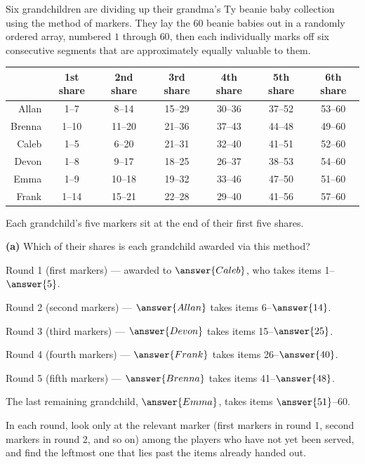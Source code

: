 \documentclass[12pt]{ximera}
\begin{document}
\begin{problem}
Six grandchildren are dividing up their grandma's Ty beanie baby collection using the
method of markers. They lay the $60$ beanie babies out in a randomly ordered array,
numbered $1$ through $60$, then each individually marks off six consecutive segments
that are approximately equally valuable to them.

\begin{center}
\begin{tabular}{r|c|c|c|c|c|c}
& 1st share & 2nd share & 3rd share & 4th share & 5th share & 6th share \\\hline
Allan  & 1--7  & 8--14  & 15--29 & 30--36 & 37--52 & 53--60 \\
Brenna & 1--10 & 11--20 & 21--36 & 37--43 & 44--48 & 49--60 \\
Caleb  & 1--5  & 6--20  & 21--31 & 32--40 & 41--51 & 52--60 \\
Devon  & 1--8  & 9--17  & 18--25 & 26--37 & 38--53 & 54--60 \\
Emma   & 1--9  & 10--18 & 19--32 & 33--46 & 47--50 & 51--60 \\
Frank  & 1--14 & 15--21 & 22--28 & 29--40 & 41--56 & 57--60
\end{tabular}
\end{center}

Each grandchild's five markers sit at the end of their first five shares.

\begin{prompt}
\textbf{(a)} Which of their shares is each grandchild awarded via this method?

Round 1 (first markers) --- awarded to $\answer{Caleb}$, who takes items 1--$\answer{5}$.

\smallskip
Round 2 (second markers) --- $\answer{Allan}$ takes items 6--$\answer{14}$.

\smallskip
Round 3 (third markers) --- $\answer{Devon}$ takes items 15--$\answer{25}$.

\smallskip
Round 4 (fourth markers) --- $\answer{Frank}$ takes items 26--$\answer{40}$.

\smallskip
Round 5 (fifth markers) --- $\answer{Brenna}$ takes items 41--$\answer{48}$.

\smallskip
The last remaining grandchild, $\answer{Emma}$, takes items $\answer{51}$--60.

\begin{hint}
In each round, look only at the relevant marker (first markers in round 1, second
markers in round 2, and so on) among the players who have not yet been served, and
find the leftmost one that lies past the items already handed out.
\end{hint}


\end{prompt}
\end{problem}
\end{document}
